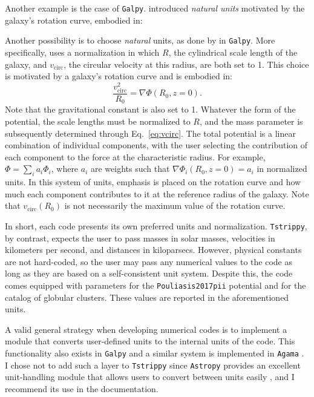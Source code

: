     Another example is the case of \texttt{Galpy}. \citet{2015ApJS..216...29B} introduced \textit{natural units} motivated by the galaxy's rotation curve, embodied in:

    Another possibility is to choose \textit{natural} units, as done by \citet{2015ApJS..216...29B} in \texttt{Galpy}. More specifically, \citet{2015ApJS..216...29B} uses a normalization in which $R$, the cylindrical scale length of the galaxy, and $v_\mathrm{circ}$, the circular velocity at this radius, are both set to 1. This choice is motivated by a galaxy's rotation curve and is embodied in:
    \begin{equation}
        \frac{v_\mathrm{circ}^2}{R_0} = \nabla  \Phi \left(R_0, z=0\right).
        \label{eq:vcirc}
    \end{equation}
   Note that the gravitational constant is also set to 1. Whatever the form of the potential, the scale lengths must be normalized to $R$, and the mass parameter is subsequently determined through Eq.~\ref{eq:vcirc}. The total potential is a linear combination of individual components, with the user selecting the contribution of each component to the force at the characteristic radius. For example, $\Phi = \sum_i a_i\Phi_i$, where $a_i$ are weights such that $\nabla \Phi_i(R_0, z=0) = a_i$ in normalized units. In this system of units, emphasis is placed on the rotation curve and how much each component contributes to it at the reference radius of the galaxy. Note that $v_\mathrm{circ}(R_0)$ is not necessarily the maximum value of the rotation curve.

    In short, each code presents its own preferred units and normalization. \texttt{Tstrippy}, by contrast, expects the user to pass masses in solar masses, velocities in kilometers per second, and distances in kiloparsecs. However, physical constants are not hard-coded, so the user may pass any numerical values to the code as long as they are based on a self-consistent unit system. Despite this, the code comes equipped with parameters for the \texttt{Pouliasis2017pii} potential and for the catalog of globular clusters. These values are reported in the aforementioned units.

    A valid general strategy when developing numerical codes is to implement a module that converts user-defined units to the internal units of the code. This functionality also exists in \texttt{Galpy} and a similar system is implemented in \texttt{Agama} \citep{2018arXiv180208255V}. I chose not to add such a layer to \texttt{Tstrippy} since \texttt{Astropy} provides an excellent unit-handling module that allows users to convert between units easily \citep{2013A&A...558A..33A}, and I recommend its use in the documentation. 



